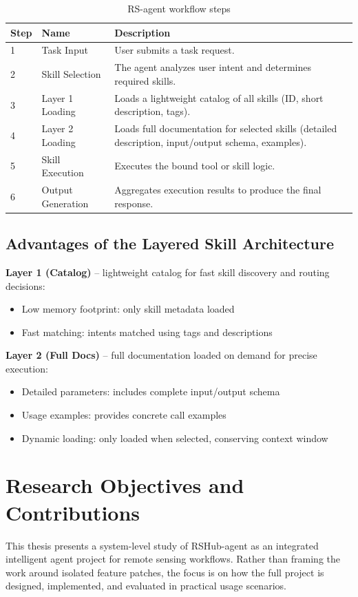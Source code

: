 {	\begin{table}[H]
		\centering
		\footnotesize
		\caption{RS-agent workflow steps}
		\label{tab:workflow-steps}
		\begin{tabular}{l l p{8cm}}
			\hline
			Step & Name & Description \\
			\hline
			1 & Task Input & User submits a task request. \\
			2 & Skill Selection & The agent analyzes user intent and determines required skills. \\
			3 & Layer 1 Loading & Loads a lightweight catalog of all skills (ID, short description, tags). \\
			4 & Layer 2 Loading & Loads full documentation for selected skills (detailed description, input/output schema, examples). \\
			5 & Skill Execution & Executes the bound tool or skill logic. \\
			6 & Output Generation & Aggregates execution results to produce the final response. \\
			\hline
		\end{tabular}
	\end{table}
	
	\subsection{Advantages of the Layered Skill Architecture}
	
	\textbf{Layer 1 (Catalog)} – lightweight catalog for fast skill discovery and routing decisions:
	\begin{itemize}
		\item Low memory footprint: only skill metadata loaded
		\item Fast matching: intents matched using tags and descriptions
	\end{itemize}
	
	\textbf{Layer 2 (Full Docs)} – full documentation loaded on demand for precise execution:
	\begin{itemize}
		\item Detailed parameters: includes complete input/output schema
		\item Usage examples: provides concrete call examples
		\item Dynamic loading: only loaded when selected, conserving context window
	\end{itemize}
	
\section{Research Objectives and Contributions}
This thesis presents a system-level study of RSHub-agent as an integrated intelligent agent project for remote sensing workflows. Rather than framing the work around isolated feature patches, the focus is on how the full project is designed, implemented, and evaluated in practical usage scenarios.

}
